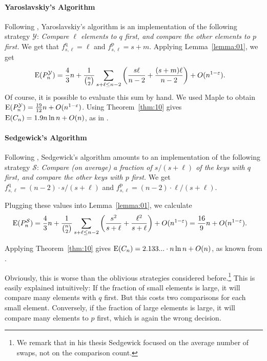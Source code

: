 \documentclass[prodmode,acmtalg]{acmsmall}
\newcommand{\E}{\textnormal{\textrm{E}}}
\begin{document}
\paragraph{Yaroslavskiy's Algorithm}
Following \cite[Section 3.2]{nebel12}, Yaroslavskiy's algorithm is an
implementation of the following
strategy $\mathcal{Y}$: \emph{Compare
 $\ell$ elements to $q$ first, and compare the other elements to $p$ first.}
We get that $f^\text{q}_{s,\ell} = \ell$ and
$f^\text{p}_{s,\ell} = s + m$. 
Applying Lemma~\ref{lemma:01}, we get 
\begin{align*}
\E(P^\mathcal{Y}_n) &= \frac{4}{3} n + \frac{1}{\binom{n}{2}}
\sum_{s + \ell \leq n - 2} \left(\frac{s\ell}{n-2} +
    \frac{(s+m)\ell}{n-2}\right) + O(n^{1 - \varepsilon}). 
\end{align*} 
Of course, it is possible to evaluate this sum by hand. We used Maple\textsuperscript{\textregistered} to obtain 
$\E(P^\mathcal{Y}_n) =  \frac{19}{12} n + O(n^{1 - \varepsilon})$.
Using Theorem~\ref{thm:10} gives  
$\E(C_n) = 1.9 n\ln n + O(n)$, as in \cite{nebel12}.

\paragraph{Sedgewick's Algorithm}\label{sec:sedgewick}
Following \cite[Section 3.2]{nebel12}, Sedgewick's algorithm amounts to an
implementation of the following strategy
$\mathcal{S}$: \emph{Compare (on average) a fraction of
$s/(s+\ell)$ of the keys with $q$ first, and compare the other keys with
$p$ first.}
We get $f^\text{q}_{s,\ell} = (n-2) \cdot
s/(s+\ell)$ and $f^\text{p}_{s,\ell} = (n-2) \cdot
\ell / (s+\ell)$.

Plugging these values into Lemma~\ref{lemma:01}, we calculate 
\begin{align*}
    \E(P^\mathcal{S}_n) &= \frac{4}{3} n + \frac{1}{\binom{n}{2}}
            \sum_{s + \ell \leq n - 2} \left(\frac{s^2}{s + \ell} +
            \frac{\ell^2}{s + \ell}\right) + O(n^{1 - \varepsilon})  =
            \frac{16}{9} n +  O(n^{1 - \varepsilon}).
\end{align*}


Applying Theorem~\ref{thm:10} gives $\E(C_n) = 2.133...
\cdot n \ln n +
O(n)$, as known from \cite{nebel12}.

Obviously, this is worse than the oblivious strategies considered before.\footnote{We remark that in his thesis
Sedgewick \cite{sedgewick} focused on the average number of swaps, not on the
comparison count.}   This is
easily explained intuitively: If the fraction of small elements is large, it
will compare many elements with $q$ first. But this costs two comparisons for
each small element. Conversely, if the fraction of large elements is large, it
will compare many elements to $p$ first, which is again the wrong decision.
\end{document}
